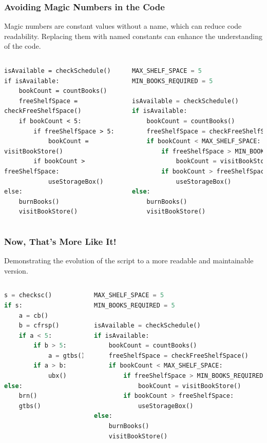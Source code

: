 \begin{frame}[fragile]
 \frametitle{Avoiding Magic Numbers in the Code}
 Magic numbers are constant values without a name, which can reduce code readability. Replacing them with named constants can enhance the understanding of the code.
 \begin{columns}[T]
     \begin{lstlisting}
isAvailable = checkSchedule()
if isAvailable:
    bookCount = countBooks()
    freeShelfSpace = checkFreeShelfSpace()
    if bookCount < 5:
        if freeShelfSpace > 5:
            bookCount = visitBookStore()
        if bookCount > freeShelfSpace:
            useStorageBox()
else:
    burnBooks()
    visitBookStore()
 \end{lstlisting}
     \begin{lstlisting}[language=Python,emph={MIN_BOOKS_REQUIRED,MAX_SHELF_SPACE},emphstyle=\color{red}]
MAX_SHELF_SPACE = 5
MIN_BOOKS_REQUIRED = 5

isAvailable = checkSchedule()
if isAvailable:
    bookCount = countBooks()
    freeShelfSpace = checkFreeShelfSpace()
    if bookCount < MAX_SHELF_SPACE:
        if freeShelfSpace > MIN_BOOKS_REQUIRED:
            bookCount = visitBookStore()
        if bookCount > freeShelfSpace:
            useStorageBox()
else:
    burnBooks()
    visitBookStore()
 \end{lstlisting}
 \end{columns}
\end{frame}

\begin{frame}[fragile]
 \frametitle{Now, That's More Like It!}
 Demonstrating the evolution of the script to a more readable and maintainable version.
 \begin{columns}[T]
     \begin{lstlisting}[language=Python]
s = checksc()
if s:
    a = cb()
    b = cfrsp()
    if a < 5:
        if b > 5:
            a = gtbs()
        if a > b:
            ubx()
else:
    brn()
    gtbs()
 \end{lstlisting}
     \begin{lstlisting}[language=Python]
MAX_SHELF_SPACE = 5
MIN_BOOKS_REQUIRED = 5

isAvailable = checkSchedule()
if isAvailable:
    bookCount = countBooks()
    freeShelfSpace = checkFreeShelfSpace()
    if bookCount < MAX_SHELF_SPACE:
        if freeShelfSpace > MIN_BOOKS_REQUIRED:
            bookCount = visitBookStore()
        if bookCount > freeShelfSpace:
            useStorageBox()
else:
    burnBooks()
    visitBookStore()
 \end{lstlisting}
 \end{columns}
\end{frame}


